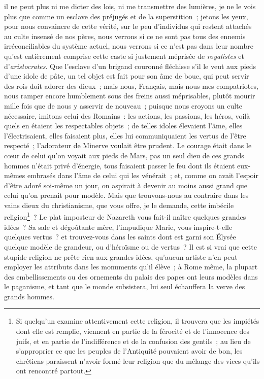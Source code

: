 \documentclass[french,twoside]{book} %
\begin{document}
il ne peut plus ni me dicter des lois, ni me transmettre des lumières, je ne le vois plus que comme un esclave des préjugés et de la superstition ; jetons les yeux, pour nous convaincre de cette vérité, sur le peu d’individus qui restent attachés au culte insensé de nos pères, nous verrons si ce ne sont pas tous des ennemis irréconciliables du système actuel, nous verrons si ce n’est pas dans leur nombre qu’est entièrement comprise cette caste si justement méprisée de {\itshape royalistes} et d’{\itshape aristocrates}. Que l’esclave d’un brigand couronné fléchisse s’il le veut aux pieds d’une idole de pâte, un tel objet est fait pour son âme de boue, qui peut servir des rois doit adorer des dieux ; mais nous, Français, mais nous mes compatriotes, nous ramper encore humblement sous des freins aussi méprisables, plutôt mourir mille fois que de nous y asservir de nouveau ; puisque nous croyons un culte nécessaire, imitons celui des Romains : les actions, les passions, les héros, voilà quels en étaient les respectables objets ; de telles idoles élevaient l’âme, elles l’électrisaient, elles faisaient plus, elles lui communiquaient les vertus de l’être respecté ; l’adorateur de Minerve voulait être prudent. Le courage était dans le cœur de celui qu’on voyait aux pieds de Mars, pas un seul dieu de ces grands hommes n’était privé d’énergie, tous faisaient passer le feu dont ils étaient eux-mêmes embrasés dans l’âme de celui qui les vénérait ; et, comme on avait l’espoir d’être adoré soi-même un jour, on aspirait à devenir au moins aussi grand que celui qu’on prenait pour modèle. Mais que trouvons-nous au contraire dans les vains dieux du christianisme, que vous offre, je le demande, cette imbécile religion\footnote{ Si quelqu’un examine attentivement cette religion, il trouvera que les impiétés dont elle est remplie, viennent en partie de la férocité et de l’innocence des juifs, et en partie de l’indifférence et de la confusion des gentils ; au lieu de s’approprier ce que les peuples de l’Antiquité pouvaient avoir de bon, les chrétiens paraissent n’avoir formé leur religion que du mélange des vices qu’ils ont rencontré partout.} ? Le plat imposteur de Nazareth vous fait-il naître quelques grandes idées ? Sa sale et dégoûtante mère, l’impudique Marie, vous inspire-t-elle quelques vertus ? et trouvez-vous dans les saints dont est garni son Élysée quelque modèle de grandeur, ou d’héroïsme ou de vertus ? Il est si vrai que cette stupide religion ne prête rien aux grandes idées, qu’aucun artiste n’en peut employer les attributs dans les monuments qu’il élève ; à Rome même, la plupart des embellissements ou des ornements du palais des papes ont leurs modèles dans le paganisme, et tant que le monde subsistera, lui seul échauffera la verve des grands hommes.\par
\end{document}
